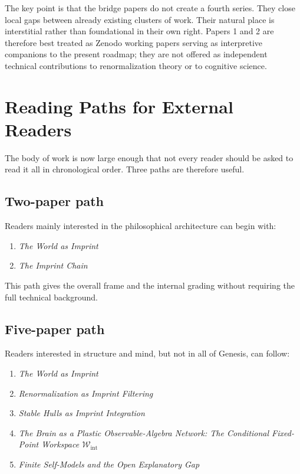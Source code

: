 \documentclass[12pt,a4paper]{article}
\begin{document}
The key point is that the bridge papers do not create a fourth series. They close local gaps between already existing clusters of work. Their natural place is interstitial rather than foundational in their own right. Papers 1 and 2 are therefore best treated as Zenodo working papers serving as interpretive companions to the present roadmap; they are not offered as independent technical contributions to renormalization theory or to cognitive science.

\section{Reading Paths for External Readers}

The body of work is now large enough that not every reader should be asked to read it all in chronological order. Three paths are therefore useful.

\subsection{Two-paper path}

Readers mainly interested in the philosophical architecture can begin with:

\begin{enumerate}
\item \emph{The World as Imprint}
\item \emph{The Imprint Chain}
\end{enumerate}

This path gives the overall frame and the internal grading without requiring the full technical background.

\subsection{Five-paper path}

Readers interested in structure and mind, but not in all of Genesis, can follow:

\begin{enumerate}
\item \emph{The World as Imprint}
\item \emph{Renormalization as Imprint Filtering}
\item \emph{Stable Hulls as Imprint Integration}
\item \emph{The Brain as a Plastic Observable-Algebra Network: The Conditional Fixed-Point Workspace \(\mathcal W_{\mathrm{int}}\)}
\item \emph{Finite Self-Models and the Open Explanatory Gap}
\end{enumerate}
\end{document}
